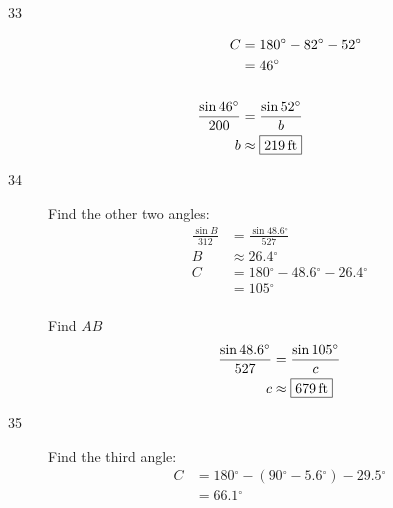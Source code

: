 \documentclass{exam}
\newcommand{\dg}{\ensuremath{^\circ}}
\begin{document}
\begin{description}

      \item[33] 
        \begin{align*}
          C & = 180 \dg - 82 \dg - 52 \dg \\
            & = 46 \dg \\
          \\
          \frac{\sin 46 \dg}{200} & = \frac{\sin 52 \dg}{b} \\
          b                       & \approx \boxed{ \unit[219]{ft} } \\
        \end{align*}

      \pagebreak

      \item[34] 
        Find the other two angles:
        \begin{align*}
          \frac{\sin B}{312} & = \frac{\sin 48.6 \dg}{527} \\
          B                  & \approx 26.4 \dg \\
          C                  & = 180 \dg - 48.6 \dg - 26.4 \dg \\
                             & = 105 \dg \\
        \end{align*}

        Find $AB$
        \begin{align*}
          \frac{\sin 48.6 \dg}{527} & = \frac{\sin 105 \dg}{c} \\
          c                         & \approx \boxed{ \unit[679]{ft} } \\
        \end{align*}

      \item[35] 
        Find the third angle:
        \begin{align*}
          C & = 180 \dg - (90 \dg - 5.6 \dg) - 29.5 \dg \\
            & = 66.1 \dg \\
        \end{align*}


\end{description}
\end{document}
